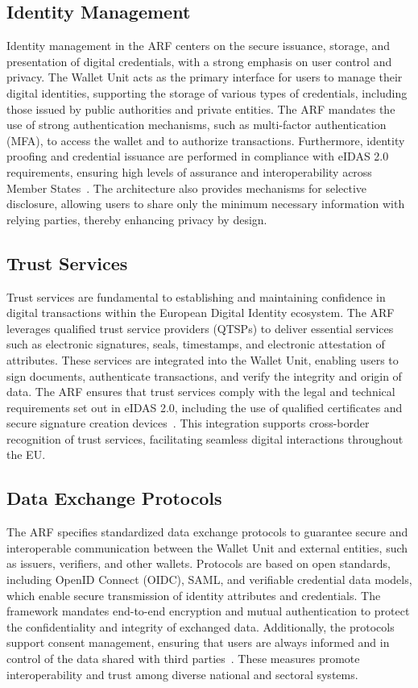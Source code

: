 \documentclass[sigconf,balance,nonacm,authordraft]{acmart}
\begin{document}
\subsection{Identity Management}
Identity management in the ARF centers on the secure issuance, storage, and presentation of digital credentials, with a strong emphasis on user control and privacy. The Wallet Unit acts as the primary interface for users to manage their digital identities, supporting the storage of various types of credentials, including those issued by public authorities and private entities. The ARF mandates the use of strong authentication mechanisms, such as multi-factor authentication (MFA), to access the wallet and to authorize transactions. Furthermore, identity proofing and credential issuance are performed in compliance with eIDAS 2.0 requirements, ensuring high levels of assurance and interoperability across Member States~\cite{EU_ARF2024,EU_eIDAS2024}. The architecture also provides mechanisms for selective disclosure, allowing users to share only the minimum necessary information with relying parties, thereby enhancing privacy by design.

\subsection{Trust Services}
Trust services are fundamental to establishing and maintaining confidence in digital transactions within the European Digital Identity ecosystem. The ARF leverages qualified trust service providers (QTSPs) to deliver essential services such as electronic signatures, seals, timestamps, and electronic attestation of attributes. These services are integrated into the Wallet Unit, enabling users to sign documents, authenticate transactions, and verify the integrity and origin of data. The ARF ensures that trust services comply with the legal and technical requirements set out in eIDAS 2.0, including the use of qualified certificates and secure signature creation devices~\cite{EU_ARF2024,EU_eIDAS2024}. This integration supports cross-border recognition of trust services, facilitating seamless digital interactions throughout the EU.

\subsection{Data Exchange Protocols}
The ARF specifies standardized data exchange protocols to guarantee secure and interoperable communication between the Wallet Unit and external entities, such as issuers, verifiers, and other wallets. Protocols are based on open standards, including OpenID Connect (OIDC), SAML, and verifiable credential data models, which enable secure transmission of identity attributes and credentials. The framework mandates end-to-end encryption and mutual authentication to protect the confidentiality and integrity of exchanged data. Additionally, the protocols support consent management, ensuring that users are always informed and in control of the data shared with third parties~\cite{EU_ARF2024}. These measures promote interoperability and trust among diverse national and sectoral systems.
\end{document}
